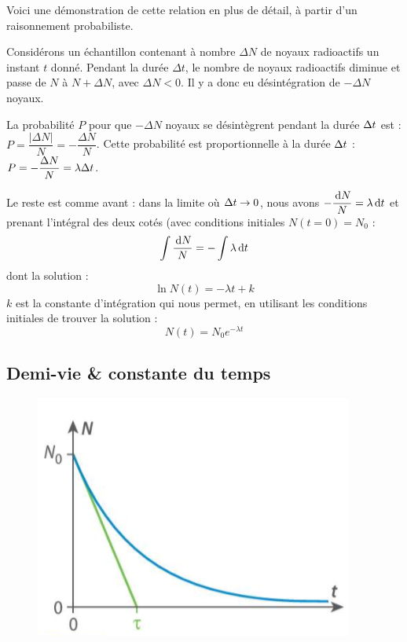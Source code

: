 \documentclass[11pt,a4paper]{article}
\begin{document}
\begin{rmrq}
Voici une démonstration de cette relation en plus de détail, à partir d'un raisonnement probabiliste. 

Considérons un échantillon contenant à nombre $\Delta N$ de noyaux radioactifs un instant $t$ donné. Pendant la durée $\Delta t$, le nombre de noyaux radioactifs diminue et passe de $N$ à $N+\Delta N$, avec $\Delta N<0$. Il y a donc eu désintégration de $-\Delta N$ noyaux. 

La probabilité $P$ pour que $-\Delta N$ noyaux se désintègrent pendant la durée $\Delta t$ est : $P = \dfrac{|\Delta N|}{ N}= -\dfrac{\Delta N}{N}$. Cette probabilité est proportionnelle à la durée $\Delta t$ : $P =- \dfrac{\Delta N}{N} = \lambda\Delta t$.

Le reste est comme avant : dans la limite où $\Delta t \rightarrow 0$, nous avons $ - \dfrac{\dl N}{N} = \lambda\dl t $ et prenant l'intégral des deux cotés (avec conditions initiales $N(t=0) = N_0$ : 
\[\int \dfrac{\dl N}{N} = - \int \lambda\dl t \]
dont la solution : 
\[ \ln{N(t)} = -\lambda t + k \]
$k$ est la constante d'intégration qui nous permet, en utilisant les conditions initiales de trouver la solution : 
\[N(t) = N_0e^{-\lambda t}\]
\end{rmrq}

\newpage
\subsection{Demi-vie \& constante du temps}

\begin{figure}
\centering
\includegraphics[width=0.95\linewidth]{imgs/p8/decroit.png}

\end{figure}
\end{document}
